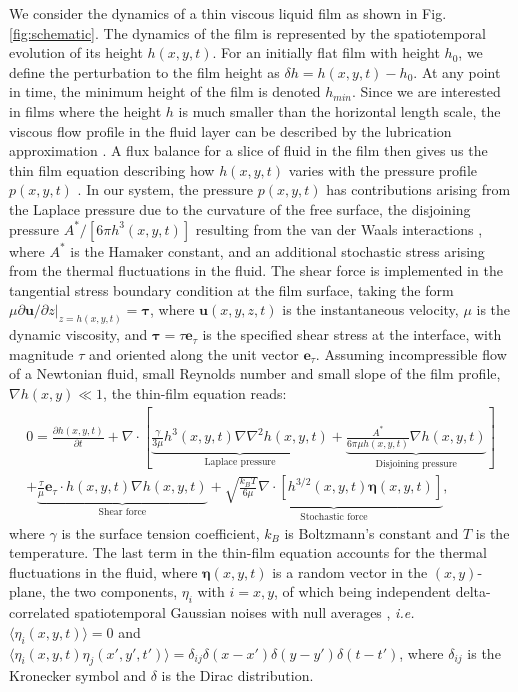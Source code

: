 \documentclass[
 onecolumn,
 amsmath,amssymb,
floatfix,superscriptaddress
]{revtex4-2}
\begin{document}
We consider the dynamics of a thin viscous liquid film as shown in Fig. \eqref{fig:schematic}. The dynamics of the film is represented by the spatiotemporal evolution of its height $h(x,y,t)$. For an initially flat film with height $h_0$, we define the perturbation to the film height as $\delta h=h(x,y,t)-h_0$. At any point in time, the minimum height of the film is denoted $h_{min}.$ Since we are interested in films where the height $h$ is much smaller than the horizontal length scale, the viscous flow profile in the fluid layer can be described by the lubrication approximation \cite{batchelor_2000}. A flux balance for a slice of fluid in the film then gives us the thin film equation describing how $h(x,y,t)$ varies with the pressure profile $p(x,y,t)$ \cite{OronBankoff1997}. In our system, the pressure $p(x,y,t)$ has contributions arising from the Laplace pressure due to the curvature of the free surface, the disjoining pressure $A^*/[6 \pi h^3(x,y,t)]$ resulting from the van der Waals interactions \cite{ISRAELACHVILI2011}, where $A^*$ is the Hamaker constant, and an additional stochastic stress arising from the thermal fluctuations in the fluid. The shear force is implemented in the tangential stress boundary condition at the film surface, taking the form $\mu\partial \textbf{u}/\partial z\rvert _{z=h(x,y,t)} = \boldsymbol{\tau}$, where $\textbf{u}(x,y,z,t)$ is the instantaneous velocity, $\mu$ is the dynamic viscosity, and $\boldsymbol{\tau}=\tau\boldsymbol{e}_\tau$ is the specified shear stress at the interface, with magnitude $\tau$ and oriented along the unit vector $\boldsymbol{e}_\tau$. Assuming incompressible flow of a Newtonian fluid, small Reynolds number and small slope of the film profile, $\nabla h(x,y) \ll 1 $, the thin-film equation reads:
  \begin{eqnarray}
    0=\frac{\partial h(x,y,t)}{\partial t} +  \nabla \cdot \left[\underbrace{\frac{\gamma}{3 \mu}h^3(x,y,t) \nabla\nabla ^2h(x,y,t)}_\text{Laplace pressure} + \underbrace{\frac{A^*}{6\pi\mu h(x,y,t)}\nabla h(x,y,t)}_\text{Disjoining pressure}\right] \nonumber \\+ \underbrace{\frac{\tau}{\mu} \boldsymbol{e}_\tau\cdot h(x,y,t)\nabla h(x,y,t)}_\text{Shear force}  + \underbrace{\sqrt{\frac{k_B T}{6\mu }}\nabla \cdot\left[h^{3/2}(x,y,t)\boldsymbol{\eta}(x,y,t)\right]}_\text{Stochastic force},
\label{eq:dimTF}
\end{eqnarray}
where $\gamma$ is the surface tension coefficient, $k_B$ is Boltzmann's constant and $T$ is the temperature. The last term in the thin-film equation accounts for the thermal fluctuations in the fluid, where $\boldsymbol{\eta}(x,y,t)$ is a random vector in the $(x,y)$-plane, the two components, $\eta_i$ with $i=x,y$, of which being 
independent delta-correlated spatiotemporal Gaussian noises with null averages \cite{MeckeRauscher_2005,davidovitch2005}, \textit{i.e.} $\langle\eta_i(x,y,t)\rangle=0$ and $\langle\eta_i(x,y,t)\eta_j(x',y',t')\rangle=\delta_{ij}\delta(x-x')\delta(y-y')\delta(t-t')$, where $\delta_{ij}$ is the Kronecker symbol and $\delta$ is the Dirac distribution.
\end{document}
